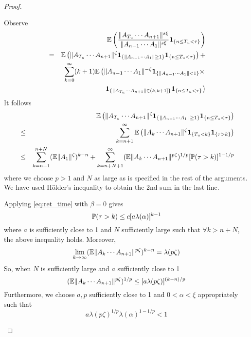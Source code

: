 \documentclass{article}
\theoremstyle{remark}
\begin{document}
\begin{proof}
\begin{enumerate}
      Observe
      \begin{eqnarray*}
        &&
          \E
        \left(
          {
            \|A_{T_u} \cdots A_{n+1} \|^{s\xi}
            \over
            \|A_{n-1} \cdots A_1\|^{s\xi}
         }
         \1{n \leq T_u < \tau}
          \right) \\
          &=&
          \E \left(
            \|A_{T_u} \cdots A_{n+1}\|^\zeta 
            \1{\|A_{n-1} \cdots A_1\| \geq 1}
            \1{n \leq T_u < \tau}
          \right) +\\
          &&
          \sum_{k=0}^\infty
          (k+1)
          \E \left(
            \|A_{n-1} \cdots A_1\|^{-\zeta}
            \1{\|A_{n-1} \cdots A_1\| < 1} \times \right.\\
          &&
            \left.
            \1{\|A_{T_u} \cdots A_{n+1}\| \in (k, k+1]}
            \1{n \leq T_u < \tau}
          \right)
      \end{eqnarray*}
      It follows
      \begin{eqnarray*}
        && \E \left(
          \|A_{T_u} \cdots A_{n+1}\|^\zeta 
          \1{\|A_{n-1} \cdots A_1\| \geq 1}
          \1{n \leq T_u < \tau}
        \right) \\
        &\leq&
        \sum_{k=n+1}^\infty
        \E \left(
          \|A_k \cdots A_{n+1}\|^\zeta \1{T_u < k} \1{\tau > k}
        \right) \\
        &\leq&
        \sum_{k=n+1}^{n+N} (\E \|A_1\|^\zeta)^{k-n} +
        \sum_{k=n+N+1}^\infty (\E \|A_k \cdots A_{n+1}\|^{p\zeta})^{1/p}
        [\P(\tau > k)]^{1 - 1/p}
      \end{eqnarray*}
      where we choose $p > 1$ and $N$ as large as is specified in the
      rest of the arguments. We have used H\"older's inequality to
      obtain the 2nd sum in the last line.

      Applying \eqref{eq:ret_time} with $\beta = 0$ gives
      \begin{equation*}
        \P(\tau > k) \leq c [a \lambda(\alpha)]^{k-1}
      \end{equation*}
      where $a$ is sufficiently close to 1 and $N$ sufficiently large
      such that $\forall k > n + N$, the above inequality holds.
      Moreover,
      \begin{equation*}
        \lim_{k \to \infty} (\E \|A_{k} \cdots
        A_{n+1}\|^{p\zeta})^{k-n} = \lambda(p\zeta)
      \end{equation*}
      So, when $N$ is sufficiently large and $a$ sufficiently close to 1
      \begin{equation*}
        (\E \|A_k \cdots A_{n+1}\|^{p\zeta})^{1/p} \leq [a \lambda(p\zeta)]^{(k-n)/p}
      \end{equation*}
      Furthermore, we choose $a, p$ sufficiently close to 1 and
      $0 < \alpha < \xi$ appropriately such that
      \begin{equation*}
        a \lambda(p\zeta)^{1/p} \lambda(\alpha)^{1-1/p} < 1
      \end{equation*}
    \end{enumerate}
\end{proof}




\end{document}
